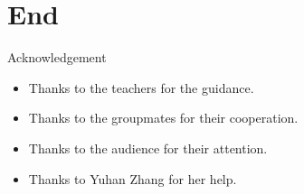 \documentclass[UTF8]{ctexbeamer}
\begin{document}
\section{End}
\begin{frame}{Acknowledgement}
    \begin{itemize}
        \item Thanks to the teachers for the guidance.
        \item Thanks to the groupmates for their cooperation.
        \item Thanks to the audience for their attention.
        \item Thanks to Yuhan Zhang for her help.
    \end{itemize}
\end{frame}
\end{document}
